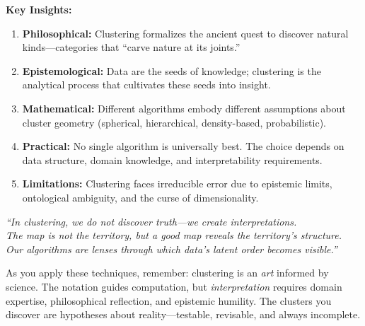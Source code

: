 \textbf{Key Insights:}

\begin{enumerate}
    \item \textbf{Philosophical:} Clustering formalizes the ancient quest to discover natural kinds---categories that ``carve nature at its joints.''
    
    \item \textbf{Epistemological:} Data are the seeds of knowledge; clustering is the analytical process that cultivates these seeds into insight.
    
    \item \textbf{Mathematical:} Different algorithms embody different assumptions about cluster geometry (spherical, hierarchical, density-based, probabilistic).
    
    \item \textbf{Practical:} No single algorithm is universally best. The choice depends on data structure, domain knowledge, and interpretability requirements.
    
    \item \textbf{Limitations:} Clustering faces irreducible error due to epistemic limits, ontological ambiguity, and the curse of dimensionality.
\end{enumerate}

\begin{center}
\itshape
``In clustering, we do not discover truth—we create interpretations. \\
The map is not the territory, but a good map reveals the territory's structure. \\
Our algorithms are lenses through which data's latent order becomes visible.''
\end{center}

\vspace{1cm}

As you apply these techniques, remember: clustering is an \textit{art} informed by science. The notation guides computation, but \textit{interpretation} requires domain expertise, philosophical reflection, and epistemic humility. The clusters you discover are hypotheses about reality---testable, revisable, and always incomplete.

\clearpage
